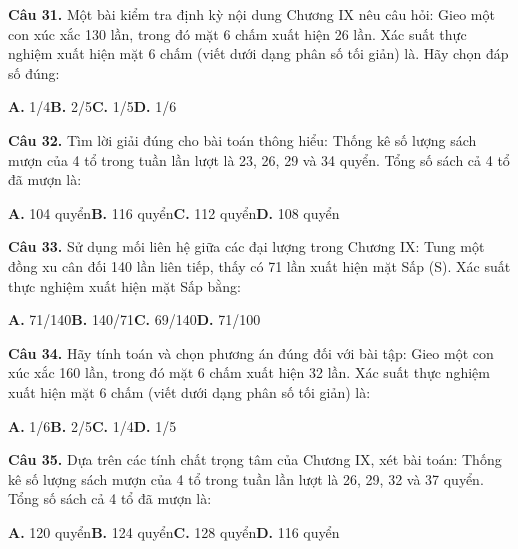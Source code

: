 \documentclass[11pt,a4paper]{article}
\begin{document}
\textbf{\color{primary} Câu 31.} Một bài kiểm tra định kỳ nội dung Chương IX nêu câu hỏi: Gieo một con xúc xắc 130 lần, trong đó mặt 6 chấm xuất hiện 26 lần. Xác suất thực nghiệm xuất hiện mặt 6 chấm (viết dưới dạng phân số tối giản) là. Hãy chọn đáp số đúng:\par
\hspace*{1.5em}\textbf{A.} 1/4\quad\quad \textbf{B.} 2/5\quad\quad \textbf{C.} 1/5\quad\quad \textbf{D.} 1/6\par\vspace{2pt}
\textbf{\color{primary} Câu 32.} Tìm lời giải đúng cho bài toán thông hiểu: Thống kê số lượng sách mượn của 4 tổ trong tuần lần lượt là 23, 26, 29 và 34 quyển. Tổng số sách cả 4 tổ đã mượn là:\par
\hspace*{1.5em}\textbf{A.} 104 quyển\quad\quad \textbf{B.} 116 quyển\quad\quad \textbf{C.} 112 quyển\quad\quad \textbf{D.} 108 quyển\par\vspace{2pt}
\textbf{\color{primary} Câu 33.} Sử dụng mối liên hệ giữa các đại lượng trong Chương IX: Tung một đồng xu cân đối 140 lần liên tiếp, thấy có 71 lần xuất hiện mặt Sấp (S). Xác suất thực nghiệm xuất hiện mặt Sấp bằng:\par
\hspace*{1.5em}\textbf{A.} 71/140\quad\quad \textbf{B.} 140/71\quad\quad \textbf{C.} 69/140\quad\quad \textbf{D.} 71/100\par\vspace{2pt}
\textbf{\color{primary} Câu 34.} Hãy tính toán và chọn phương án đúng đối với bài tập: Gieo một con xúc xắc 160 lần, trong đó mặt 6 chấm xuất hiện 32 lần. Xác suất thực nghiệm xuất hiện mặt 6 chấm (viết dưới dạng phân số tối giản) là:\par
\hspace*{1.5em}\textbf{A.} 1/6\quad\quad \textbf{B.} 2/5\quad\quad \textbf{C.} 1/4\quad\quad \textbf{D.} 1/5\par\vspace{2pt}
\textbf{\color{primary} Câu 35.} Dựa trên các tính chất trọng tâm của Chương IX, xét bài toán: Thống kê số lượng sách mượn của 4 tổ trong tuần lần lượt là 26, 29, 32 và 37 quyển. Tổng số sách cả 4 tổ đã mượn là:\par
\hspace*{1.5em}\textbf{A.} 120 quyển\quad\quad \textbf{B.} 124 quyển\quad\quad \textbf{C.} 128 quyển\quad\quad \textbf{D.} 116 quyển\par\vspace{2pt}
\end{document}
